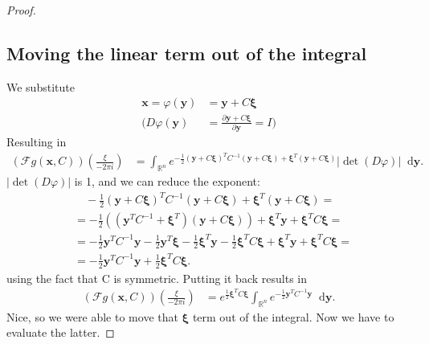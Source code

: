 \documentclass{paper}
\newcommand{\abs}[1]{\left| #1 \right|}
\newcommand{\F}{\ensuremath{\mathcal{F}}}
\newcommand{\vr}[1]{\ensuremath{\boldsymbol{#1}}}
\newcommand{\f}[1]{#1}
\newcommand*\diff{\mathop{}\!\mathrm{d}}
\newcommand{\xivec}[0]{\ensuremath{\vr{\xi{}}}}
\newcommand{\yvec}[0]{\ensuremath{\vr{y}}}
\begin{document}
\begin{proof}
\subsection*{Moving the linear term out of the integral}
We substitute
\begin{align*}
	\vr{x} = \varphi(\vr{y}) &= \vr{y} + C\vr{\xi} \\
	\Bigg( \f{D}\varphi(\yvec) &= \frac{\partial \vr{y} + C\vr{\xi}}{\partial \vr{y}} = I \Bigg)
\end{align*}
Resulting in
\begin{align*}
	(\F g(\vr{x}, C))(\frac{\xi}{-2 \pi i})
	&= \int_{\mathbb{R}^n} e^{-\frac{1}{2} (\yvec + C\xivec)^T C^{-1} (\yvec + C\xivec) + \xivec^T (\yvec + C\xivec)} \abs{\det(\f{D}\varphi)} \diff \yvec.
\end{align*}
$\abs{\det(\f{D}\varphi)}$ is 1, and we can reduce the exponent:
\begin{align*}
	&\quad -\frac{1}{2} (\yvec + C\xivec)^T C^{-1} (\yvec + C\xivec) + \xivec^T (\yvec + C\xivec) = \\
	&= -\frac{1}{2} \left( (\yvec^T C^{-1} + \xivec^T)(\yvec + C \xivec) \right) + \xivec^T \yvec + \xivec^T C \xivec = \\
	&= -\frac{1}{2} \yvec^T C^{-1} \yvec - \frac{1}{2} \yvec^T \xivec -\frac{1}{2} \xivec^T \yvec -\frac{1}{2} \xivec^T C \xivec + \xivec^T \yvec + \xivec^T C \xivec = \\
	&= -\frac{1}{2} \yvec^T C^{-1} \yvec + \frac{1}{2} \xivec^T C \xivec.
\end{align*}
using the fact that C is symmetric.
Putting it back results in
\begin{align}
	\label{eq:fourier_only_gauss_int_left}
	(\F g(\vr{x}, C))(\frac{\xi}{-2 \pi i})
	&= e^{\frac{1}{2} \xivec^T C \xivec} \int_{\mathbb{R}^n} e^{-\frac{1}{2} \yvec^T C^{-1} \yvec}  \diff \yvec.
\end{align}
Nice, so we were able to move that $\xivec$ term out of the integral.
Now we have to evaluate the latter.



\end{proof}
\end{document}
